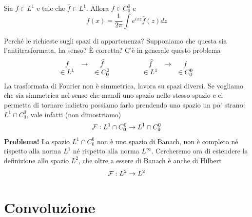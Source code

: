 \begin{thm}
Sia $f\in L^{1}$ e tale che $\hat{f} \in L^{1}$. Allora $f\in C^{0}_{0}$ e
\begin{equation*}
\boxed{f(x) = \frac{1}{2\pi}\int e^{ixz}\hat{f}(z) dz}
\end{equation*}
\end{thm}
Perché le richieste sugli spazi di appartenenza? Supponiamo che questa sia l'antitrasformata, ha senso? È corretta? C'è in generale questo problema
\begin{equation*}
\begin{array}{c c c}
f & \rightarrow & \hat{f}\\
\in L^{1} & & \in C^{0}_{0}
\end{array} \ \ \ \ \ \ \ \ \ \ \ \
\begin{array}{c c c}
\hat{f} & \rightarrow & f\\
\in L^{1} & & \in C^{0}_{0}
\end{array}
\end{equation*}
La trasformata di Fourier non è simmetrica, lavora su spazi diversi. Se vogliamo che sia simmetrica nel senso che mandi uno spazio nello stesso spazio e ci permetta di tornare indietro possiamo farlo prendendo uno spazio un po' strano: $L^{1} \cap C^{0}_{0}$, vale infatti (non dimostriamo)
\begin{equation*}
\Fc : L^{1} \cap C^{0}_{0}\rightarrow L^{1} \cap C^{0}_{0}
\end{equation*}
\textbf{Problema!} Lo spazio $L^{1} \cap C^{0}_{0}$ non è uno spazio di Banach, non è completo né rispetto alla norma $L^{1}$ né rispetto alla norma $L^{\infty}$. Cercheremo ora di estendere la definizione allo spazio $L^{2}$, che oltre a essere di Banach è anche di Hilbert
\begin{equation*}
\Fc : L^{2}\rightarrow L^{2}
\end{equation*}

\section{Convoluzione}

